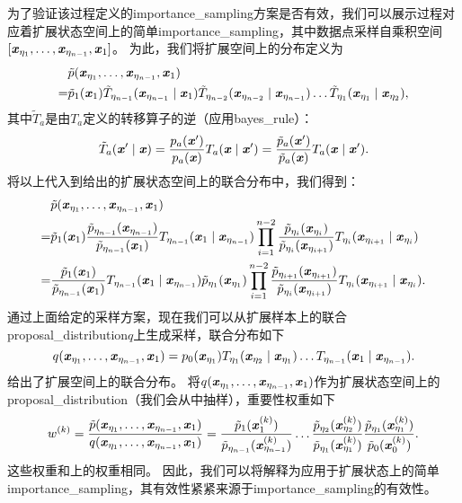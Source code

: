 为了验证该过程定义的\gls{importance_sampling}方案是否有效，我们可以展示\citep{Neal-2001}过程对应着扩展状态空间上的简单\gls{importance_sampling}，其中数据点采样自乘积空间$[\Vx_{\eta_1},\dots,\Vx_{\eta_{n-1}},\Vx_1]$。
为此，我们将扩展空间上的分布定义为
\begin{align}
&\tilde{p} (\Vx_{\eta_1}, \dots, \Vx_{\eta_{n-1}}, \Vx_1) \\
= &\tilde{p}_1 (\Vx_1) \tilde{T}_{\eta_{n-1}} (\Vx_{\eta_{n-1}} \mid \Vx_1)
 	\tilde{T}_{\eta_{n-2}}  (\Vx_{\eta_{n-2}} \mid \Vx_{\eta_{n-1}}) \dots
 	\tilde{T}_{\eta_1} (\Vx_{\eta_1} \mid \Vx_{\eta_2}) \label{eq:18.55} ,
\end{align}
其中$\tilde{T}_a$是由$T_a$定义的转移算子的逆（应用\gls{bayes_rule}）：
\begin{equation}
	\tilde{T}_a (\Vx' \mid \Vx) = \frac{p_a(\Vx')}{ p_a(\Vx) } T_a(\Vx \mid \Vx') = 
\frac{  \tilde{p}_a(\Vx')}{ \tilde{p}_a(\Vx) } T_a(\Vx \mid \Vx') .
\end{equation}
将以上代入到给出的扩展状态空间上的联合分布中，我们得到：
\begin{align}
	&\tilde{p} (\Vx_{\eta_1}, \dots, \Vx_{\eta_{n-1}}, \Vx_1) \\
	= &\tilde{p}_1 (\Vx_1) \frac{ \tilde{p}_{\eta_{n-1}} (\Vx_{\eta_{n-1}})  }{ \tilde{p}_{\eta_{n-1}}(\Vx_1)} T_{\eta_{n-1}} (\Vx_1 \mid \Vx_{\eta_{n-1}})
\prod_{i=1}^{n-2} \frac{ \tilde{p}_{\eta_i}(\Vx_{\eta_i}) }{ \tilde{p}_{\eta_i}(\Vx_{\eta_{i+1}})} T_{\eta_i} (\Vx_{\eta_{i+1}} \mid \Vx_{\eta_i}) \\
	= &\frac{ \tilde{p}_1(\Vx_1) }{ \tilde{p}_{\eta_{n-1}}(\Vx_1) } T_{\eta_{n-1}} (\Vx_1 \mid \Vx_{\eta_{n-1}})
\tilde{p}_{\eta_1} (\Vx_{\eta_1}) \prod_{i=1}^{n-2} \frac{ \tilde{p}_{\eta_{i+1}}(\Vx_{\eta_{i+1}}) }{ \tilde{p}_{\eta_i}(\Vx_{\eta_{i+1}}) } T_{\eta_i} (\Vx_{\eta_{i+1}} \mid \Vx_{\eta_i}) . \label{eq:18.59}
\end{align}
通过上面给定的采样方案，现在我们可以从扩展样本上的联合\gls{proposal_distribution}$q$上生成采样，联合分布如下
\begin{equation}
	q(\Vx_{\eta_1}, \dots, \Vx_{\eta_{n-1}}, \Vx_1)  = p_0(\Vx_{\eta_1}) T_{\eta_1}( \Vx_{\eta_2} \mid \Vx_{\eta_1} ) \dots T_{\eta_{n-1}} (\Vx_1 \mid \Vx_{\eta_{n-1}}) .
\end{equation}
给出了扩展空间上的联合分布。
将$q(\Vx_{\eta_1}, \dots, \Vx_{\eta_{n-1}}, \Vx_1)$作为扩展状态空间上的\gls{proposal_distribution}（我们会从中抽样），重要性权重如下
\begin{equation}
	w^{(k)} = \frac{ \tilde{p}(\Vx_{\eta_1}, \dots, \Vx_{\eta_{n-1}}, \Vx_1) }{ q( \Vx_{\eta_1}, \dots, \Vx_{\eta_{n-1}}, \Vx_1 ) } =
\frac{ \tilde{p}_1(\Vx_1^{(k)}) }{ \tilde{p}_{\eta_{n-1}}(\Vx_{\eta_{n-1}}^{(k)}) } \dots
\frac{ \tilde{p}_{\eta_{2}}(\Vx_{\eta_{2}}^{(k)}) }{ \tilde{p}_{\eta_1}(\Vx_{\eta_{1}}^{(k)}) } 
\frac{ \tilde{p}_{\eta_{1}}(\Vx_{\eta_{1}}^{(k)}) }{ \tilde{p}_{0}(\Vx_{0}^{(k)}) } .
\end{equation}
这些权重和上的权重相同。
因此，我们可以将解释为应用于扩展状态上的简单\gls{importance_sampling}，其有效性紧紧来源于\gls{importance_sampling}的有效性。

